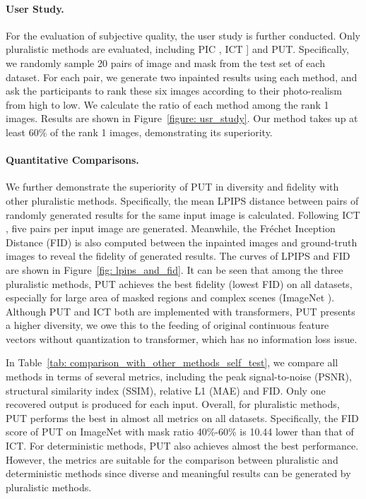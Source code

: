 \documentclass[10pt,twocolumn,letterpaper]{article}
\newcommand{\Tref}[1]{Table~\ref{#1}}
\newcommand{\Fref}[1]{Figure~\ref{#1}}
\begin{document}
\paragraph{User Study.} For the evaluation of subjective quality, the user study is further conducted. Only pluralistic methods are evaluated, including PIC \cite{zheng2019pluralistic}, ICT \cite{wan2021high}] and PUT. Specifically, we randomly sample 20 pairs of image and mask from the test set of each dataset. For each pair, we generate two inpainted results using each method, and ask the participants to rank these six images according to their photo-realism from high to low. 
We calculate the ratio of each method among the rank 1 images.
Results are shown in \Fref{figure: usr_study}. Our method takes up at least 60\% of the rank 1 images, demonstrating its superiority.


\paragraph{Quantitative Comparisons.} We further demonstrate the superiority of PUT in diversity and fidelity with other pluralistic methods. Specifically, the mean LPIPS distance \cite{zhang2018unreasonable}  between pairs of randomly generated results for the same input image is calculated. Following ICT \cite{wan2021high}, five pairs per input image are generated. Meanwhile, the Fréchet Inception Distance (FID) \cite{heusel2017gans} is also computed between the inpainted images and ground-truth images to reveal the fidelity of generated results. The curves of LPIPS and FID are shown in \Fref{fig: lpips_and_fid}. It can be seen that among the three pluralistic methods, PUT achieves the best fidelity (lowest FID) on all datasets, especially for large area of masked regions and complex scenes (ImageNet \cite{deng2009imagenet}). Although PUT and ICT both are implemented with transformers, 
PUT presents a higher diversity, we owe this to the feeding of original continuous feature vectors without quantization to transformer,
which has no information loss issue.

In \Tref{tab: comparison_with_other_methods_self_test}, we compare all methods in terms of several metrics, including the peak signal-to-noise (PSNR), structural similarity index (SSIM), relative L1 (MAE) and FID. 
Only one recovered output is produced for each input. Overall, for pluralistic methods, PUT performs the best in almost all metrics on all datasets. Specifically, the FID score of PUT on ImageNet with mask ratio 40\%-60\% is 10.44 lower than that of ICT. For deterministic methods, PUT also achieves almost the best performance. However, the metrics are suitable for the comparison between pluralistic and deterministic methods since diverse and meaningful results can be generated by pluralistic methods.
\end{document}
